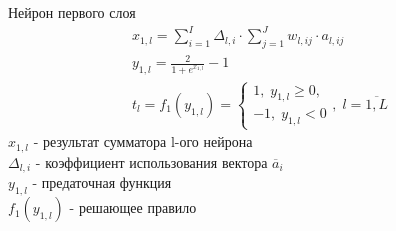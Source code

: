 \begin{frame}{Нейрон первого слоя}
    \begin{gather*}
        x_{1,l} = \sum_{i=1}^{I} \Delta_{l,i} \cdot \sum_{j=1}^{J}w_{l,ij}\cdot a_{l,ij} \\
        y_{1,l} = \frac{2}{1 + e^{x_{1,l}}} - 1 \\
        t_l = f_1(y_{1,l}) = 
        \begin{cases}   
            1,\; y_{1,l} \geq 0,\\
            -1,\; y_{1,l} < 0
        \end{cases}
        ,\; l = \overline{1,L}
    \end{gather*}
    $x_{1,l}$ - результат сумматора l-ого нейрона \\
    $\Delta_{l,i}$ - коэффициент использования вектора $\overline{a}_i$ \\
    $y_{1,l}$ - предаточная функция \\
    $f_1(y_{1,l})$ - решающее правило
\end{frame}
